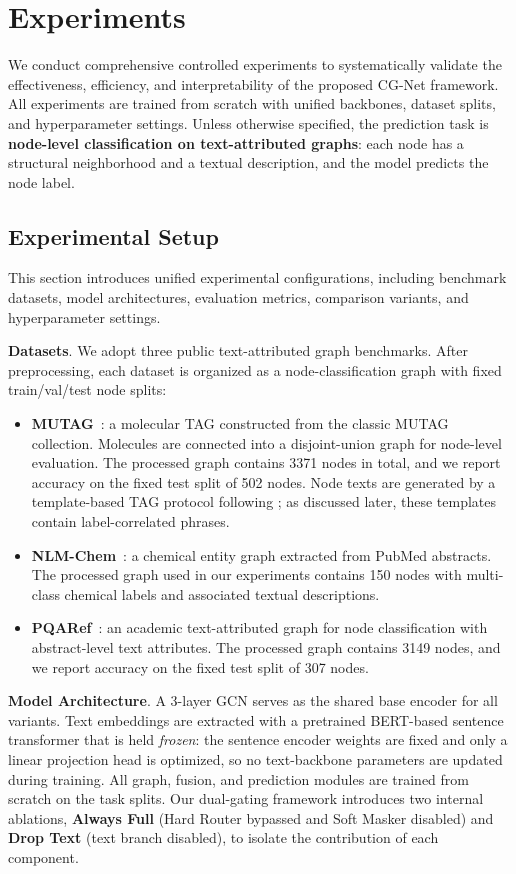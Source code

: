 \documentclass[preprint,12pt,authoryear]{elsarticle}
\begin{document}
\section{Experiments}
We conduct comprehensive controlled experiments to systematically validate the effectiveness, efficiency, and interpretability of the proposed CG-Net framework. All experiments are trained from scratch with unified backbones, dataset splits, and hyperparameter settings. Unless otherwise specified, the prediction task is \textbf{node-level classification on text-attributed graphs}: each node has a structural neighborhood and a textual description, and the model predicts the node label.

\subsection{Experimental Setup}
This section introduces unified experimental configurations, including benchmark datasets, model architectures, evaluation metrics, comparison variants, and hyperparameter settings.

\noindent\textbf{Datasets}. We adopt three public text-attributed graph benchmarks. After preprocessing, each dataset is organized as a node-classification graph with fixed train/val/test node splits:
\begin{itemize}
    \item \textbf{MUTAG}~\citep{debnath1998mutag}: a molecular TAG constructed from the classic MUTAG collection. Molecules are connected into a disjoint-union graph for node-level evaluation. The processed graph contains 3371 nodes in total, and we report accuracy on the fixed test split of 502 nodes. Node texts are generated by a template-based TAG protocol following \citep{yun2023multimodal}; as discussed later, these templates contain label-correlated phrases.
    \item \textbf{NLM-Chem}~\citep{leaman2021nlmchem}: a chemical entity graph extracted from PubMed abstracts. The processed graph used in our experiments contains 150 nodes with multi-class chemical labels and associated textual descriptions.
    \item \textbf{PQARef}~\citep{han2020pqaref}: an academic text-attributed graph for node classification with abstract-level text attributes. The processed graph contains 3149 nodes, and we report accuracy on the fixed test split of 307 nodes.
\end{itemize}

\noindent\textbf{Model Architecture}. A 3-layer GCN \citep{kipf2017gcn} serves as the shared base encoder for all variants. Text embeddings are extracted with a pretrained BERT-based sentence transformer \citep{devlin2019bert} that is held \emph{frozen}: the sentence encoder weights are fixed and only a linear projection head is optimized, so no text-backbone parameters are updated during training. All graph, fusion, and prediction modules are trained from scratch on the task splits. Our dual-gating framework introduces two internal ablations, \textbf{Always Full} (Hard Router bypassed and Soft Masker disabled) and \textbf{Drop Text} (text branch disabled), to isolate the contribution of each component.
\end{document}
